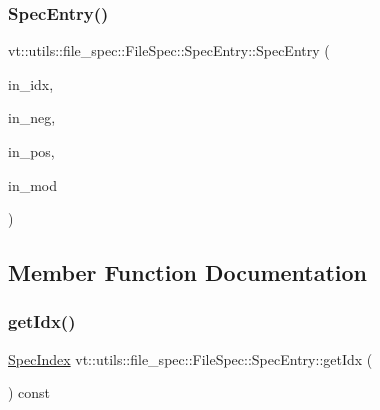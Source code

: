 \mbox{\label{structvt_1_1utils_1_1file__spec_1_1_file_spec_1_1_spec_entry_a4413c3e9ba86a4a1077d48a9fee7f0cd}} 
\subsubsection{\texorpdfstring{Spec\+Entry()}{SpecEntry()}\hspace{0.1cm}{\footnotesize\ttfamily [2/2]}}
{\footnotesize\ttfamily vt\+::utils\+::file\+\_\+spec\+::\+File\+Spec\+::\+Spec\+Entry\+::\+Spec\+Entry (\begin{DoxyParamCaption}\item[{\hyperlink{structvt_1_1utils_1_1file__spec_1_1_file_spec_a3817fca09dbe932e0f6ba5729f1965ba}{Spec\+Index}}]{in\+\_\+idx,  }\item[{\hyperlink{structvt_1_1utils_1_1file__spec_1_1_file_spec_a3817fca09dbe932e0f6ba5729f1965ba}{Spec\+Index}}]{in\+\_\+neg,  }\item[{\hyperlink{structvt_1_1utils_1_1file__spec_1_1_file_spec_a3817fca09dbe932e0f6ba5729f1965ba}{Spec\+Index}}]{in\+\_\+pos,  }\item[{bool}]{in\+\_\+mod }\end{DoxyParamCaption})\hspace{0.3cm}{\ttfamily [inline]}}



\subsection{Member Function Documentation}
\mbox{\label{structvt_1_1utils_1_1file__spec_1_1_file_spec_1_1_spec_entry_a4402ebf9148659e8d11d9b1885cfff9d}} 
\subsubsection{\texorpdfstring{get\+Idx()}{getIdx()}}
{\footnotesize\ttfamily \hyperlink{structvt_1_1utils_1_1file__spec_1_1_file_spec_a3817fca09dbe932e0f6ba5729f1965ba}{Spec\+Index} vt\+::utils\+::file\+\_\+spec\+::\+File\+Spec\+::\+Spec\+Entry\+::get\+Idx (\begin{DoxyParamCaption}{ }\end{DoxyParamCaption}) const\hspace{0.3cm}{\ttfamily [inline]}}




